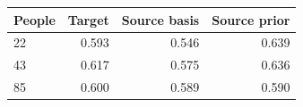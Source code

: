\begin{tabular*}{\linewidth}{@{\extracolsep{\fill}}lrrr@{}}
\toprule
People & Target & Source basis & Source prior \\
\midrule
22 & 0.593 & 0.546 & 0.639 \\
43 & 0.617 & 0.575 & 0.636 \\
85 & 0.600 & 0.589 & 0.590 \\
\bottomrule
\end{tabular*}